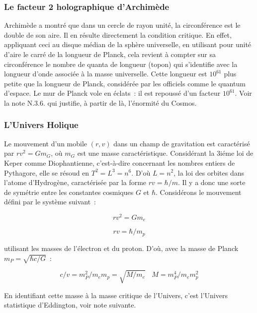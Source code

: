 \documentclass[a4paper,12pt]{article}
\begin{document}
\subsubsection{Le facteur 2 holographique d'Archimède}

Archimède a montré que dans un cercle de rayon unité, la circonférence est le double de son aire. Il en résulte directement la condition critique. En effet, appliquant ceci au disque médian de la sphère universelle, en utilisant pour unité d’aire le carré de la longueur de Planck, cela revient à compter sur sa circonférence le nombre de quanta de longueur (topon) qui s’identifie avec la longueur d’onde associée à la masse universelle. Cette longueur est $10^{61}$ plus petite que la longueur de Planck, considérée par les officiels comme le quantum d’espace. Le mur de Planck vole en éclats : il est repoussé d’un facteur $10^{61}$. Voir la note N.3.6. qui justifie, à partir de là, l’énormité du Cosmos. 



\subsubsection{L'Univers Holique}

 Le mouvement d'un mobile $(r,v)$ dans un champ de gravitation est caractérisé par $rv^2 = Gm_G$, où $m_G$ est une masse caractéristique. Considérant la 3iéme loi de Keper comme Diophantienne, c’est-à-dire concernant les nombres entiers de Pythagore, elle se résoud en $T^2 = L^3 = n^6$. D'où $L = n^2$, la loi des orbites dans l'atome d'Hydrogène, caractérisée par la forme $rv = \hbar/m$. Il y a donc une sorte de symétrie entre les constantes cosmiques $G$ et $\hbar$. Considérons le mouvement défini par le système suivant :
 
\begin{equation}
r v^2 = Gm_e
\end{equation}

\begin{equation}
r v = \hbar/m_p
\end{equation}

utilisant les masses de l'électron et du proton. D'où, avec la masse de Planck $m_P = \sqrt{\hbar c/G}$ :

\begin{equation}
c/v = m_P^2/m_em_p = \sqrt{M/m_e}                 ~~~~           M = m_P^4/m_em_p^2
\end{equation}

En identifiant cette masse à la masse critique de l'Univers, c'est  l'Univers statistique d'Eddington, voir note suivante.
\end{document}
